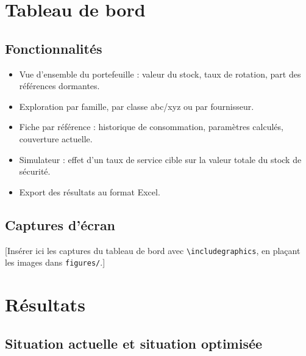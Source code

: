 
\section{Tableau de bord}
\label{sec:dashboard}

\subsection{Fonctionnalités}

\begin{itemize}
  \item Vue d'ensemble du portefeuille : valeur du stock, taux de rotation,
    part des références dormantes.
  \item Exploration par famille, par classe \gls{abc}/\gls{xyz} ou par
    fournisseur.
  \item Fiche par référence : historique de consommation, paramètres calculés,
    couverture actuelle.
  \item Simulateur : effet d'un taux de service cible sur la valeur totale du
    stock de sécurité.
  \item Export des résultats au format Excel.
\end{itemize}

\subsection{Captures d'écran}

\hspace{1cm}[Insérer ici les captures du tableau de bord avec
\texttt{\textbackslash includegraphics}, en plaçant les images dans
\texttt{figures/}.]

\section{Résultats}
\label{sec:resultats}

\subsection{Situation actuelle et situation optimisée}

